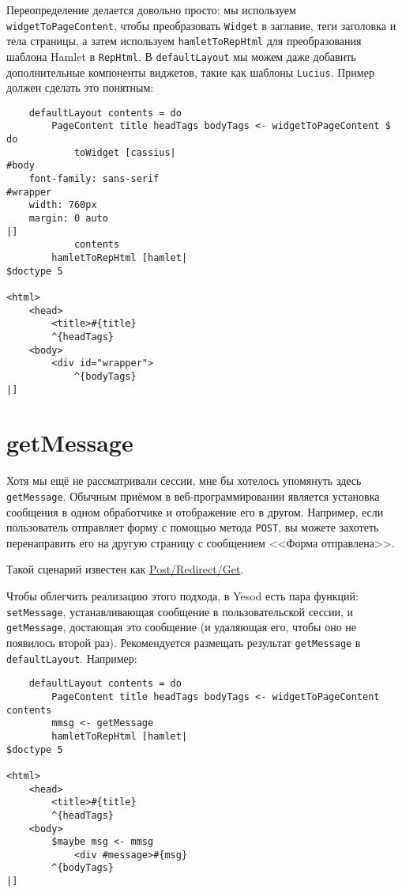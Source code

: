 Переопределение делается довольно просто: мы используем \lstinline!widgetToPageContent!, чтобы преобразовать \lstinline!Widget! в заглавие, теги заголовка и тела страницы, а затем используем \lstinline!hamletToRepHtml! для преобразования шаблона Hamlet в \lstinline!RepHtml!. В \lstinline!defaultLayout! мы можем даже добавить дополнительные компоненты виджетов, такие как шаблоны \lstinline!Lucius!. Пример должен сделать это понятным:

\begin{lstlisting}
    defaultLayout contents = do
        PageContent title headTags bodyTags <- widgetToPageContent $ do
            toWidget [cassius|
#body
    font-family: sans-serif
#wrapper
    width: 760px
    margin: 0 auto
|]
            contents
        hamletToRepHtml [hamlet|
$doctype 5

<html>
    <head>
        <title>#{title}
        ^{headTags}
    <body>
        <div id="wrapper">
            ^{bodyTags}
|]
\end{lstlisting}%

\section {getMessage}

Хотя мы ещё не рассматривали сессии, мне бы хотелось упомянуть здесь \lstinline!getMessage!. Обычным приёмом в веб-программировании является установка сообщения в одном обработчике и отображение его в другом. Например, если пользователь отправляет форму с помощью метода \lstinline!POST!, вы можете захотеть перенаправить его на другую страницу с сообщением <<Форма отправлена>>.

\begin{remark}
Такой сценарий известен как \href{http://en.wikipedia.org/wiki/Post/Redirect/Get}{Post/Redirect/Get}\footnotemark[\value{footnote}].
\end{remark}


Чтобы облегчить реализацию этого подхода, в Yesod есть пара функций: \lstinline!setMessage!, устанавливающая сообщение в пользовательской сессии, и \lstinline!getMessage!, достающая это сообщение (и удаляющая его, чтобы оно не появилось второй раз). Рекомендуется размещать результат \lstinline!getMessage! в \lstinline!defaultLayout!. Например:

\begin{lstlisting}
    defaultLayout contents = do
        PageContent title headTags bodyTags <- widgetToPageContent contents
        mmsg <- getMessage
        hamletToRepHtml [hamlet|
$doctype 5

<html>
    <head>
        <title>#{title}
        ^{headTags}
    <body>
        $maybe msg <- mmsg
            <div #message>#{msg}
        ^{bodyTags}
|]
\end{lstlisting}%

